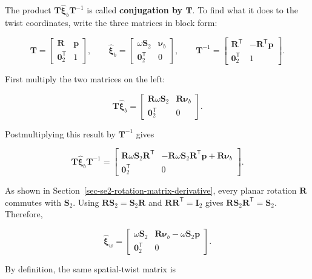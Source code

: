 \documentclass[
  australian,
  12pt,
  letterpaper,
  DIV=11,
  numbers=noendperiod,
  twoside]{scrreprt}
\begin{document}
The product \(\mathbf T\widehat{\boldsymbol\xi}_b\mathbf T^{-1}\) is
called \textbf{conjugation by \(\mathbf T\)}. To find what it does to
the twist coordinates, write the three matrices in block form:

\[
\mathbf T
=
\begin{bmatrix}
\mathbf R&\mathbf p\\
\mathbf 0_2^\mathsf T&1
\end{bmatrix},
\qquad
\widehat{\boldsymbol\xi}_b
=
\begin{bmatrix}
\omega\mathbf S_2&\boldsymbol\nu_b\\
\mathbf 0_2^\mathsf T&0
\end{bmatrix},
\qquad
\mathbf T^{-1}
=
\begin{bmatrix}
\mathbf R^\mathsf T&-\mathbf R^\mathsf T\mathbf p\\
\mathbf 0_2^\mathsf T&1
\end{bmatrix}.
\]

First multiply the two matrices on the left:

\[
\mathbf T\widehat{\boldsymbol\xi}_b
=
\begin{bmatrix}
\mathbf R\omega\mathbf S_2&\mathbf R\boldsymbol\nu_b\\
\mathbf 0_2^\mathsf T&0
\end{bmatrix}.
\]

Postmultiplying this result by \(\mathbf T^{-1}\) gives

\[
\mathbf T\widehat{\boldsymbol\xi}_b\mathbf T^{-1}
=
\begin{bmatrix}
\mathbf R\omega\mathbf S_2\mathbf R^\mathsf T&
-\mathbf R\omega\mathbf S_2\mathbf R^\mathsf T\mathbf p
+\mathbf R\boldsymbol\nu_b\\
\mathbf 0_2^\mathsf T&0
\end{bmatrix}.
\]

As shown in Section~\ref{sec-se2-rotation-matrix-derivative}, every
planar rotation \(\mathbf R\) commutes with \(\mathbf S_2\). Using
\(\mathbf R\mathbf S_2=\mathbf S_2\mathbf R\) and
\(\mathbf R\mathbf R^\mathsf T=\mathbf I_2\) gives
\(\mathbf R\mathbf S_2\mathbf R^\mathsf T=\mathbf S_2\). Therefore,

\[
\widehat{\boldsymbol\xi}_w
=
\begin{bmatrix}
\omega\mathbf S_2&
\mathbf R\boldsymbol\nu_b-\omega\mathbf S_2\mathbf p\\
\mathbf 0_2^\mathsf T&0
\end{bmatrix}.
\]

By definition, the same spatial-twist matrix is
\end{document}
